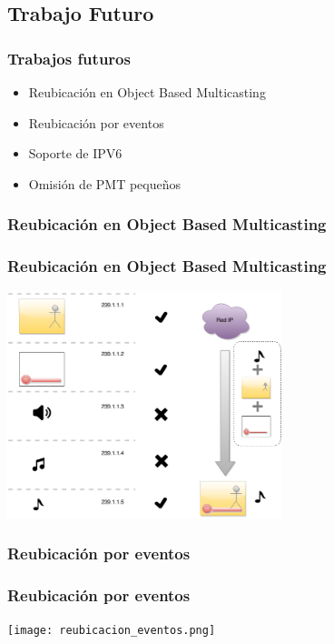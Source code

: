 \documentclass[a4paper,11pt]{beamer}
\begin{document}
	\subsection{Trabajo Futuro}
	\begin{frame}
		\frametitle{Trabajos futuros}
		\begin{itemize}
			\item Reubicación en Object Based Multicasting
			\item Reubicación por eventos
			\item Soporte de IPV6
			\item Omisión de PMT pequeños
		\end{itemize}
	\end{frame}
		
		\subsubsection{Reubicación en Object Based Multicasting}
		\begin{frame}
			\frametitle{Reubicación en Object Based Multicasting}
			\begin{center}
				\includegraphics[width=8cm]{object_based_multicast.png}
			\end{center}
		\end{frame}

		\subsubsection{Reubicación por eventos}
		\begin{frame}
			\frametitle{Reubicación por eventos}
			\begin{center}
				\texttt{[image: reubicacion\_eventos.png]}
			\end{center}
		\end{frame}
		
\end{document}
